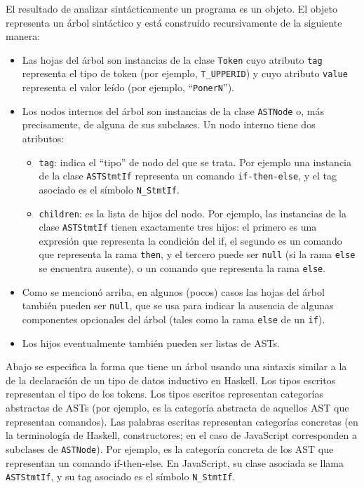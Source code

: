 \documentclass{article}
\begin{document}
El resultado de analizar sint\'acticamente un programa es un objeto.
El objeto representa un \'arbol sint\'actico y est\'a construido
recursivamente de la siguiente manera:
\begin{itemize}
\item Las hojas del \'arbol son instancias de la clase \texttt{Token}
      cuyo atributo 
      \texttt{tag} representa el tipo de token (por ejemplo,
      \texttt{T\_UPPERID})
      y cuyo atributo \texttt{value} representa el valor le\'ido
      (por ejemplo, ``\texttt{PonerN}'').
\item Los nodos internos del \'arbol son instancias de la clase
      \texttt{ASTNode} o, m\'as precisamente, de alguna de sus subclases.
      Un nodo interno tiene dos atributos:
      \begin{itemize}
      \item \texttt{tag}: indica el ``tipo'' de nodo del que se trata.
            Por ejemplo
            una instancia de la clase \texttt{ASTStmtIf}
            representa un comando \texttt{if-then-else},
            y el tag asociado es el s\'imbolo \texttt{N\_StmtIf}.
      \item \texttt{children}: es la lista de hijos del nodo.
            Por ejemplo,
            las instancias de la clase \texttt{ASTStmtIf}
            tienen exactamente tres hijos:
            el primero es una expresi\'on que representa la condici\'on
            del if,
            el segundo es un comando que representa la rama \texttt{then},
            y el tercero puede ser \texttt{null} (si la rama \texttt{else}
            se encuentra ausente), o un comando que representa la rama \texttt{else}.
      \end{itemize}
\item Como se mencion\'o arriba, en algunos (pocos) casos
      las hojas del \'arbol tambi\'en pueden ser \texttt{null},
      que se usa para indicar la ausencia de algunas
      componentes opcionales del \'arbol (tales como la rama \texttt{else}
      de un \texttt{if}).
\item Los hijos eventualmente tambi\'en pueden ser listas de ASTs.
\end{itemize}

Abajo se especifica la forma que tiene un \'arbol usando una sintaxis
similar a la de la declaraci\'on de un tipo de datos inductivo en
Haskell.
Los tipos escritos  representan el tipo de los tokens.
Los tipos escritos  representan categor\'ias
abstractas de ASTs
(por ejemplo,  es la categor\'ia abstracta de aquellos
AST que representan comandos).
Las palabras escritas  representan categor\'ias concretas
(en la terminolog\'ia de Haskell, constructores; en el caso de JavaScript
corresponden a subclases de \texttt{ASTNode}).
Por ejemplo,  es la categor\'ia concreta de los AST que
representan un comando if-then-else.
En JavaScript, su clase asociada se llama \texttt{ASTStmtIf},
y su tag asociado es el s\'imbolo \texttt{N\_StmtIf}.
\end{document}
